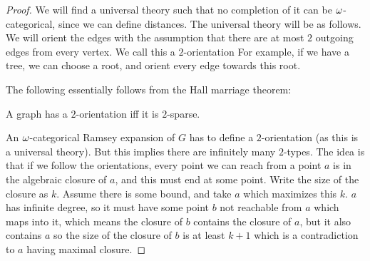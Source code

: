 \documentclass{amsart}
\begin{document}
\begin{proof}
We will find a universal theory such that no completion of it can be $\omega$-categorical,
since we can define distances. 
The universal theory will be as follows. 
We will orient the edges with the assumption that there are at most $2$ outgoing edges
from every vertex. We call this a $2$-orientation
For example, if we have a tree, we can choose a root, and orient every edge towards this root.

The following essentially follows from the Hall marriage theorem:
\begin{fact}
A graph has a $2$-orientation iff it is $2$-sparse.
\end{fact}

An $\omega$-categorical Ramsey expansion of $G$ has to define a $2$-orientation (as this is a
universal theory). But this implies there are infinitely many $2$-types. The idea is that
if we follow the orientations, every point we can reach from a point $a$ is in the
algebraic closure of $a$, and this must end at some point. Write the size of the closure
as $k$. Assume there is some bound, and take $a$ which maximizes this $k$. $a$ has
infinite degree, so it must have some point $b$ not reachable from $a$ which maps into
it, which means the closure of $b$ contains the closure of $a$, but it also
contains $a$ so the size of the closure of $b$ is at least $k+1$ which is a contradiction
to $a$ having maximal closure.
\end{proof}
\end{document}
